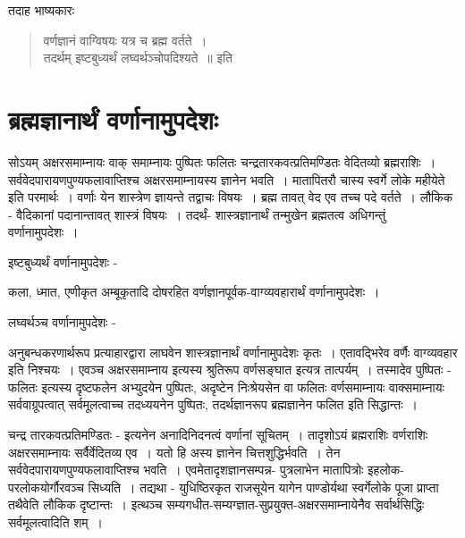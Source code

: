 {तदाह भाष्यकारः 		
\begin{verse}
वर्णज्ञानं वाग्विषयः यत्र च ब्रह्म वर्तते~। \\
तदर्थम् इष्टबुध्यर्थं लघ्वर्थञ्चोपदिश्यते~॥ इति
\end{verse}

\section*{ब्रह्मज्ञानार्थं वर्णानामुपदेशः}	

सोऽयम् अक्षरसमाम्नायः वाक् समाम्नायः पुष्पितः फलितः चन्द्रतारकवत्प्रतिमण्डितः वेदितव्यो ब्रह्मराशिः~। सर्ववेदपारायणपुण्यफलावाप्तिश्च अक्षरसमाम्नायस्य ज्ञानेन भवति~। मातापितरौ चास्य स्वर्गे लोके महीयेते इति परमार्थः~। वर्णाः येन शास्त्रेण ज्ञायन्ते तद्वाचः विषयः~। ब्रह्म तावत् वेद एव तच्च पदे वर्तते~। लौकिक - वैदिकानां पदानान्तावत्  शास्त्रं विषयः~। तदर्थं- शास्त्रज्ञानार्थं तन्मुखेन ब्रह्मतत्व अधिगन्तुं वर्णानामुपदेशः~। 	

इष्टबुध्यर्थं वर्णानामुपदेशः -

कला, ध्मात, एणीकृत अम्बूकृतादि दोषरहित वर्णज्ञानपूर्वक-वाग्व्यवहारार्थं वर्णानामुपदेशः~। 

लघ्वर्थञ्च वर्णानामुपदेशः -	

अनुबन्धकरणार्थरूप प्रत्याहारद्वारा लाघवेन शास्त्रज्ञानार्थं वर्णानामुपदेशः कृतः~। एतावद्भिरेव वर्णैः वाग्व्यवहार इति निश्चयः~। एवञ्च अक्षरसमाम्नाय इत्यस्य श्रुतिरूप वर्णसङ्घात इत्यत्र तात्पर्यम्~। तस्मादेव पुष्पितः - फलितः इत्यस्य दृष्टफलेन अभ्युदयेन पुष्पितः, अदृष्टेन निःश्रेयसेन  वा फलितः वर्णसमाम्नायः वाक्समाम्नायः सर्ववाग्रूपत्वात् सर्वमूलत्वाच्च तदध्ययनेन पुष्पितः, तदर्थज्ञानरूप ब्रह्मज्ञानेन फलित इति सिद्धान्तः~। 

चन्द्र तारकवत्प्रतिमण्डितः  - इत्यनेन अनादिनिदनत्वं वर्णानां सूचितम्~। तादृशोऽयं ब्रह्मराशिः वर्णराशिः अक्षरसमाम्नायः सर्वैर्वेदितव्य एव~। यतो हि अस्य ज्ञानेन चित्तशुद्धिर्भवति~। तेन सर्ववेदपारायणपुण्यफलावाप्तिश्च भवति~। एवमेतादृशज्ञानसम्पन्न- पुत्रलाभेन मातापित्रोः इहलोक-परलोकयोर्गौरवञ्च सिध्यति~। तद्यथा - युधिष्ठिरकृत राजसूयेन यागेन पाण्डोर्यथा स्वर्गेलोके पूजा प्राप्ता तथैवेति लौकिक दृष्टान्तः~। इत्थञ्च सम्यगधीत-सम्यग्ज्ञात-सुप्रयुक्त-अक्षरसमाम्नायेनैव सर्वार्थसिद्धिः सर्वमूलत्वादिति शम्~। 

\articleend
}
